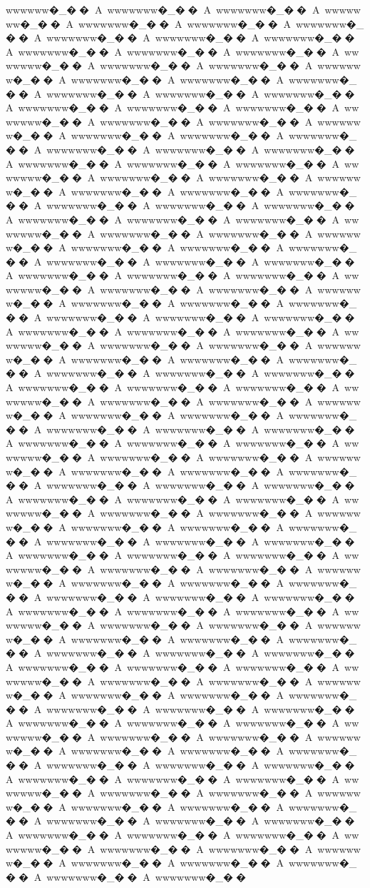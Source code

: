 {{{{{{{{{{{{{{{{{{{{{{{{{{{{{{{{{{{{{{{{{{{{{{{{{{{{{{{{{{{{{{{{{{{{{{{{{{{{{wwwwww�_��A~wwwwwww�_��A~wwwwwww�_��A~wwwwwww�_��A~wwwwwww�_��A~wwwwwww�_��A~wwwwwww�_��A~wwwwwww�_��A~wwwwwww�_��A~wwwwwww�_��A~wwwwwww�_��A~wwwwwww�_��A~wwwwwww�_��A~wwwwwww�_��A~wwwwwww�_��A~wwwwwww�_��A~wwwwwww�_��A~wwwwwww�_��A~wwwwwww�_��A~wwwwwww�_��A~wwwwwww�_��A~wwwwwww�_��A~wwwwwww�_��A~wwwwwww�_��A~wwwwwww�_��A~wwwwwww�_��A~wwwwwww�_��A~wwwwwww�_��A~wwwwwww�_��A~wwwwwww�_��A~wwwwwww�_��A~wwwwwww�_��A~wwwwwww�_��A~wwwwwww�_��A~wwwwwww�_��A~wwwwwww�_��A~wwwwwww�_��A~wwwwwww�_��A~wwwwwww�_��A~wwwwwww�_��A~wwwwwww�_��A~wwwwwww�_��A~wwwwwww�_��A~wwwwwww�_��A~wwwwwww�_��A~wwwwwww�_��A~wwwwwww�_��A~wwwwwww�_��A~wwwwwww�_��A~wwwwwww�_��A~wwwwwww�_��A~wwwwwww�_��A~wwwwwww�_��A~wwwwwww�_��A~wwwwwww�_��A~wwwwwww�_��A~wwwwwww�_��A~wwwwwww�_��A~wwwwwww�_��A~wwwwwww�_��A~wwwwwww�_��A~wwwwwww�_��A~wwwwwww�_��A~wwwwwww�_��A~wwwwwww�_��A~wwwwwww�_��A~wwwwwww�_��A~wwwwwww�_��A~wwwwwww�_��A~wwwwwww�_��A~wwwwwww�_��A~wwwwwww�_��A~wwwwwww�_��A~wwwwwww�_��A~wwwwwww�_��A~wwwwwww�_��A~wwwwwww�_��A~wwwwwww�_��A~wwwwwww�_��A~wwwwwww�_��A~wwwwwww�_��A~wwwwwww�_��A~wwwwwww�_��A~wwwwwww�_��A~wwwwwww�_��A~wwwwwww�_��A~wwwwwww�_��A~wwwwwww�_��A~wwwwwww�_��A~wwwwwww�_��A~wwwwwww�_��A~wwwwwww�_��A~wwwwwww�_��A~wwwwwww�_��A~wwwwwww�_��A~wwwwwww�_��A~wwwwwww�_��A~wwwwwww�_��A~wwwwwww�_��A~wwwwwww�_��A~wwwwwww�_��A~wwwwwww�_��A~wwwwwww�_��A~wwwwwww�_��A~wwwwwww�_��A~wwwwwww�_��A~wwwwwww�_��A~wwwwwww�_��A~wwwwwww�_��A~wwwwwww�_��A~wwwwwww�_��A~wwwwwww�_��A~wwwwwww�_��A~wwwwwww�_��A~wwwwwww�_��A~wwwwwww�_��A~wwwwwww�_��A~wwwwwww�_��A~wwwwwww�_��A~wwwwwww�_��A~wwwwwww�_��A~wwwwwww�_��A~wwwwwww�_��A~wwwwwww�_��A~wwwwwww�_��A~wwwwwww�_��A~wwwwwww�_��A~wwwwwww�_��A~wwwwwww�_��A~wwwwwww�_��A~wwwwwww�_��A~wwwwwww�_��A~wwwwwww�_��A~wwwwwww�_��A~wwwwwww�_��A~wwwwwww�_��A~wwwwwww�_��A~wwwwwww�_��A~wwwwwww�_��A~wwwwwww�_��A~wwwwwww�_��A~wwwwwww�_��A~wwwwwww�_��A~wwwwwww�_��A~wwwwwww�_��A~wwwwwww�_��A~wwwwwww�_��A~wwwwwww�_��A~wwwwwww�_��A~wwwwwww�_��A~wwwwwww�_��A~wwwwwww�_��A~wwwwwww�_��A~wwwwwww�_��A~wwwwwww�_��A~wwwwwww�_��A~wwwwwww�_��A~wwwwwww�_��A~wwwwwww�_��A~wwwwwww�_��A~wwwwwww�_��A~wwwwwww�_��A~wwwwwww�_��A~wwwwwww�_��A~wwwwwww�_��A~wwwwwww�_��A~wwwwwww�_��A~wwwwwww�_��A~wwwwwww�_��A~wwwwwww�_��A~wwwwwww�_��A~wwwwwww�_��A~wwwwwww�_��A~wwwwwww�_��A~wwwwwww�_��A~wwwwwww�_��A~wwwwwww�_��A~wwwwwww�_��A~wwwwwww�_��A~wwwwwww�_��A~wwwwwww�_��A~wwwwwww�_��A~wwwwwww�_��A~wwwwwww�_��A~wwwwwww�_��A~wwwwwww�_��A~wwwwwww�_��A~wwwwwww�_��A~wwwwwww�_��A~wwwwwww�_��A~wwwwwww�_��A~wwwwwww�_��A~wwwwwww�_��A~wwwwwww�_��A~wwwwwww�_��A~wwwwwww�_��A~wwwwwww�_��A~wwwwwww�_��A~wwwwwww�_��A~wwwwwww�_��A~wwwwwww�_��A~wwwwwww�_��A~wwwwwww�_��A~wwwwwww�_��}}}}}}}}}}}}}}}}}}}}}}}}}}}}}}}}}}}}}}}}}}}}}}}}}}}}}}}}}}}}}}}}}}}}}}}}}}}}}
